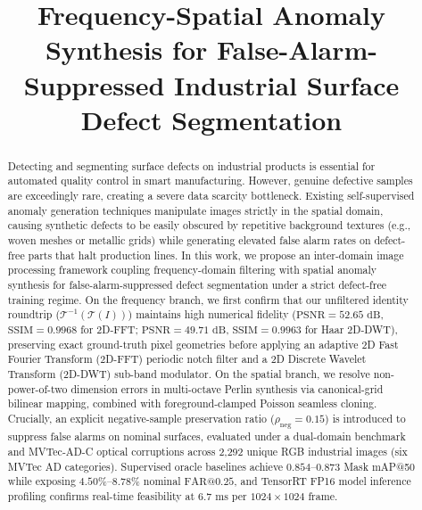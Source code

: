 \documentclass[conference]{IEEEtran}
\begin{document}
\title{Frequency-Spatial Anomaly Synthesis for False-Alarm-Suppressed Industrial Surface Defect Segmentation}

\author{
}

\maketitle

\begin{abstract}
Detecting and segmenting surface defects on industrial products is essential for automated quality control in smart manufacturing. However, genuine defective samples are exceedingly rare, creating a severe data scarcity bottleneck. Existing self-supervised anomaly generation techniques manipulate images strictly in the spatial domain, causing synthetic defects to be easily obscured by repetitive background textures (e.g., woven meshes or metallic grids) while generating elevated false alarm rates on defect-free parts that halt production lines. In this work, we propose an inter-domain image processing framework coupling frequency-domain filtering with spatial anomaly synthesis for false-alarm-suppressed defect segmentation under a strict defect-free training regime. On the frequency branch, we first confirm that our unfiltered identity roundtrip ($\mathcal{T}^{-1}(\mathcal{T}(I))$) maintains high numerical fidelity ($\text{PSNR} = 52.65\text{ dB}$, $\text{SSIM} = 0.9968$ for 2D-FFT; $\text{PSNR} = 49.71\text{ dB}$, $\text{SSIM} = 0.9963$ for Haar 2D-DWT), preserving exact ground-truth pixel geometries before applying an adaptive 2D Fast Fourier Transform (2D-FFT) periodic notch filter and a 2D Discrete Wavelet Transform (2D-DWT) sub-band modulator. On the spatial branch, we resolve non-power-of-two dimension errors in multi-octave Perlin synthesis via canonical-grid bilinear mapping, combined with foreground-clamped Poisson seamless cloning. Crucially, an explicit negative-sample preservation ratio ($\rho_{\text{neg}} = 0.15$) is introduced to suppress false alarms on nominal surfaces, evaluated under a dual-domain benchmark and MVTec-AD-C optical corruptions across 2,292 unique RGB industrial images (six MVTec AD categories). Supervised oracle baselines achieve $0.854$--$0.873$ Mask mAP@50 while exposing $4.50\%$--$8.78\%$ nominal $\text{FAR@0.25}$, and TensorRT FP16 model inference profiling confirms real-time feasibility at $6.7\text{ ms}$ per $1024 \times 1024$ frame.
\end{abstract}
\end{document}
